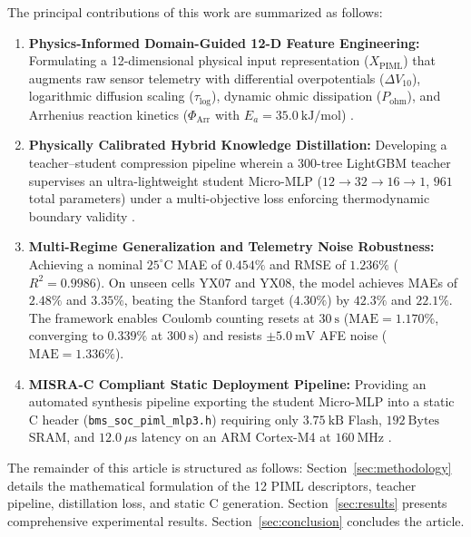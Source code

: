 The principal contributions of this work are summarized as follows:
\begin{enumerate}
	\item \textbf{Physics-Informed Domain-Guided 12-D Feature Engineering:} Formulating a 12-dimensional physical input representation ($X_{\text{PIML}}$) that augments raw sensor telemetry with differential overpotentials ($\Delta V_{10}$), logarithmic diffusion scaling ($\tau_{\text{log}}$), dynamic ohmic dissipation ($P_{\text{ohm}}$), and Arrhenius reaction kinetics ($\Phi_{\text{Arr}}$ with $E_a = 35.0\ \text{kJ/mol}$) \cite{rahimirad2019battery, li2026condition}.
	\item \textbf{Physically Calibrated Hybrid Knowledge Distillation:} Developing a teacher--student compression pipeline wherein a 300-tree LightGBM teacher supervises an ultra-lightweight student Micro-MLP ($12 \to 32 \to 16 \to 1$, $961$ total parameters) under a multi-objective loss enforcing thermodynamic boundary validity \cite{ke2017lightgbm, amirkhani2021robust}.
	\item \textbf{Multi-Regime Generalization and Telemetry Noise Robustness:} Achieving a nominal $25^\circ\text{C}$ MAE of $0.454\%$ and RMSE of $1.236\%$ ($R^2 = 0.9986$). On unseen cells YX07 and YX08, the model achieves MAEs of $2.48\%$ and $3.35\%$, beating the Stanford target ($4.30\%$) \cite{che2025enhanced} by $42.3\%$ and $22.1\%$. The framework enables Coulomb counting resets at $30\ \text{s}$ ($\text{MAE} = 1.170\%$, converging to $0.339\%$ at $300\ \text{s}$) and resists $\pm 5.0\ \text{mV}$ AFE noise ($\text{MAE} = 1.336\%$).
	\item \textbf{MISRA-C Compliant Static Deployment Pipeline:} Providing an automated synthesis pipeline exporting the student Micro-MLP into a static C header (\texttt{bms\_soc\_piml\_mlp3.h}) requiring only $3.75\ \text{kB}$ Flash, $192\ \text{Bytes}$ SRAM, and $12.0\ \mu\text{s}$ latency on an ARM Cortex-M4 at $160\ \text{MHz}$ \cite{yahyaei2023embedded, lin2020mcunet}.
\end{enumerate}

The remainder of this article is structured as follows: Section~\ref{sec:methodology} details the mathematical formulation of the 12 PIML descriptors, teacher pipeline, distillation loss, and static C generation. Section~\ref{sec:results} presents comprehensive experimental results. Section~\ref{sec:conclusion} concludes the article.